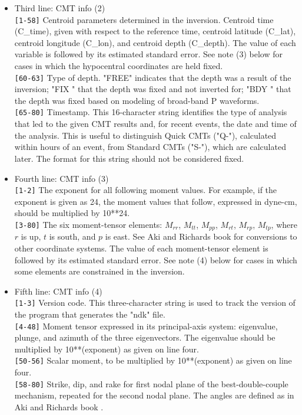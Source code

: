 \begin{itemize}
\item Third line: CMT info (2)\\
\verb|[1-58]|  Centroid parameters determined in the inversion. Centroid time ({\python C\_time}), given
        with respect to the reference time, centroid latitude ({\python C\_lat}), 
        centroid longitude ({\python C\_lon}), and centroid depth ({\python C\_depth}). 
        The value of each variable is followed
        by its estimated standard error. See note (3) below for cases in
        which the hypocentral coordinates are held fixed.\\
\verb|[60-63]| Type of depth. "FREE" indicates that the depth was a result of the
        inversion; "FIX " that the depth was fixed and not inverted for;
        "BDY " that the depth was fixed based on modeling of broad-band 
        P waveforms.\\
\verb|[65-80]| Timestamp. This 16-character string identifies the type of analysis that
        led to the given CMT results and, for recent events, the date and 
        time of the analysis. This is useful to distinguish Quick CMTs ("Q-"), 
        calculated within hours of an event, from Standard CMTs ("S-"), which 
        are calculated later. The format for this string should not be 
        considered fixed.

\item Fourth line: CMT info (3)\\
\verb|[1-2]| The exponent for all following moment values. For example, if the
        exponent is given as 24, the moment values that follow, expressed in 
        dyne-cm, should be multiplied by 10**24.\\
\verb|[3-80]| The six moment-tensor elements: $M_{rr}$, $M_{tt}$, $M_{pp}$, $M_{rt}$, $M_{rp}$, $M_{tp}$, 
        where $r$ is up, $t$ is south, and $p$ is east. See Aki and Richards book \cite{akirichards}
        for conversions to other coordinate systems. The value of each moment-tensor
        element is followed by its estimated standard error. See note (4)
        below for cases in which some elements are constrained in the inversion.
        
\item Fifth line: CMT info (4)\\
\verb|[1-3]|   Version code. This three-character string is used to track the version 
        of the program that generates the "ndk" file.\\
\verb|[4-48]|  Moment tensor expressed in its principal-axis system: eigenvalue, 
        plunge, and azimuth of the three eigenvectors. The eigenvalue should be
        multiplied by 10**(exponent) as given on line four.\\
\verb|[50-56]| Scalar moment, to be multiplied by 10**(exponent) as given on line four.\\
\verb|[58-80]| Strike, dip, and rake for first nodal plane of the best-double-couple 
        mechanism, repeated for the second nodal plane. The angles are defined
        as in Aki and Richards book \cite{akirichards}.

\end{itemize}
          
